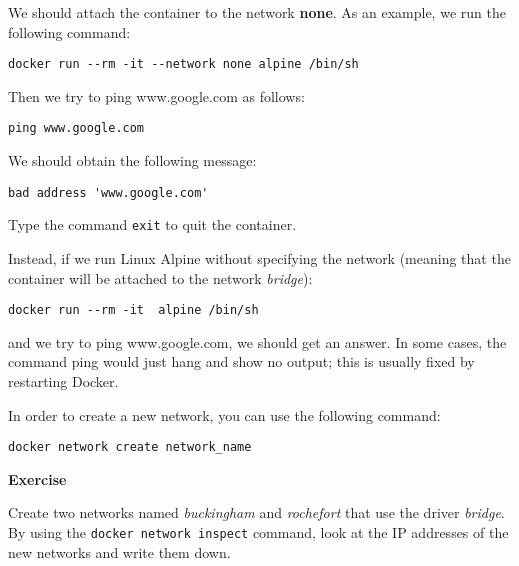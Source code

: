 \documentclass[
]{article}
\newenvironment{infobox}[1]
  {
  \begin{itemize}
  \renewcommand{\labelitemi}{
    \raisebox{-.7\height}[0pt][0pt]{
      
    }
  }
  \setlength{\fboxsep}{1em}
  \begin{whitebox}
  \item
  }
  {
  \end{whitebox}
  \end{itemize}
  }
\theoremstyle{definition}
\theoremstyle{definition}
\theoremstyle{definition}
\theoremstyle{remark}
\let\BeginKnitrBlock\begin \let\EndKnitrBlock\end
\begin{document}
\begin{infobox}{exercisebox}

We should attach the container to the network \textbf{none}.
As an example, we run the following command:

\begin{verbatim}
docker run --rm -it --network none alpine /bin/sh
\end{verbatim}

Then we try to ping www.google.com as follows:

\begin{verbatim}
ping www.google.com
\end{verbatim}

We should obtain the following message:

\begin{verbatim}
bad address 'www.google.com'
\end{verbatim}

Type the command \texttt{exit} to quit the container.

Instead, if we run Linux Alpine without specifying the network
(meaning that the container will be attached to the network \emph{bridge}):

\begin{verbatim}
docker run --rm -it  alpine /bin/sh
\end{verbatim}

and we try to ping www.google.com, we should get an answer.
In some cases, the command ping would just hang and show no
output; this is usually fixed by restarting Docker.

\end{infobox}

In order to create a new network, you can use the following command:

\begin{verbatim}
docker network create network_name
\end{verbatim}

\begin{infobox}{exercisebox}

\textbf{Exercise}

\BeginKnitrBlock{exercise}
\protect\hypertarget{exr:unnamed-chunk-34}{}{\label{exr:unnamed-chunk-34} }Create two networks named \emph{buckingham} and \emph{rochefort} that
use the driver \emph{bridge}.
By using the \texttt{docker\ network\ inspect} command,
look at the IP addresses of the new networks and write them down.
\EndKnitrBlock{exercise}

\end{infobox}
\end{document}
